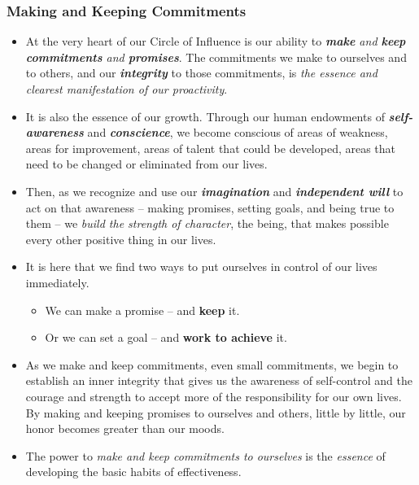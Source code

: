\documentclass[11pt]{article}
\begin{document}
\subsubsection{Making and Keeping Commitments}
\begin{itemize}
\item At the very heart of our Circle of Influence is our ability to \emph{\textbf{make} and \textbf{keep} \textbf{commitments} and \textbf{promises}}. The commitments we make to ourselves and to others, and our \emph{\textbf{integrity}} to those commitments, is \emph{the essence and clearest manifestation of our proactivity}.

\item It is also the essence of our growth. Through our human endowments of \emph{\textbf{self-awareness}} and \emph{\textbf{conscience}}, we become conscious of areas of weakness, areas for improvement, areas of talent that could be developed, areas that need to be changed or eliminated from our lives. 

\item Then, as we recognize and use our \emph{\textbf{imagination}} and \emph{\textbf{independent will}} to act on that awareness -- making promises, setting goals,
and being true to them -- we \emph{build the strength of character}, the being, that makes possible every other positive thing in our lives.

\item It is here that we find two ways to put ourselves in control of our lives immediately. 
\begin{itemize}
\item We can make a promise -- and \textbf{keep} it. 
\item Or we can set a goal -- and \textbf{work to achieve} it.
\end{itemize}

\item As we make and keep commitments, even small commitments, we begin to establish an inner integrity that gives us the awareness of self-control and the courage and strength to accept more of the responsibility for our own lives. By making and keeping promises to ourselves and others, little by little, our honor becomes greater than our moods.

\item The power to \emph{make and keep commitments to ourselves} is the \emph{essence} of developing the basic habits of effectiveness. 
\end{itemize}
\end{document}
